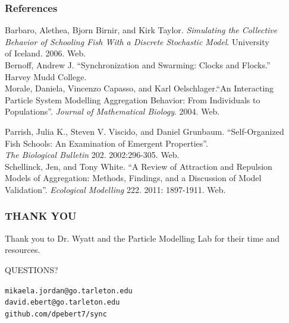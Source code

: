 \documentclass[xcolor=dvipsnames]{beamer}
\begin{document}
\begin{frame}
	\frametitle{References}
	\footnotesize{
	Barbaro, Alethea, Bjorn Birnir, and Kirk Taylor. \textit{Simulating the Collective} \\
	\hspace{0.5cm} \textit{Behavior of Schooling Fish With a Discrete Stochastic Model}. University\\
	\hspace{0.5cm} of Iceland. 2006. Web. \\
	
	\noindent Bernoff, Andrew J. ``Synchronization and Swarming: Clocks and Flocks.'' \\
	\hspace{0.5cm} Harvey Mudd College. \\
	
	\noindent Morale, Daniela, Vincenzo Capasso, and Karl Oelschlager.``An Interacting \\
	\hspace{0.5cm} Particle System Modelling Aggregation Behavior: From Individuals to\\
	\hspace{0.5cm} Populations''. \textit{Journal of Mathematical Biology}. 2004. Web.
	
	\noindent Parrish, Julia K., Steven V. Viscido, and Daniel Grunbaum. ``Self-Organized \\
	\hspace{0.5cm} Fish Schools: An Examination of Emergent Properties''. \\  
	\hspace{0.5cm} \textit{The Biological Bulletin} 202. 2002:296-305. Web. \\
	
	\noindent Schellinck, Jen, and Tony White. ``A Review of Attraction and Repulsion\\
	\hspace{0.5cm} Models of Aggregation: Methods, Findings, and a Discussion of Model \\
	\hspace{0.5cm} Validation''. \textit{Ecological Modelling} 222. 2011: 1897-1911. Web.
	}
\end{frame}

\begin{frame}
	\frametitle{THANK YOU} 
	Thank you to Dr. Wyatt and the Particle Modelling Lab for their time and resources.
	\vspace{20 pt}
	\begin{center}
		{\Huge QUESTIONS?} \\
	\end{center}
	\vspace{20 pt}	
	\texttt{mikaela.jordan@go.tarleton.edu} \\
	\texttt{david.ebert@go.tarleton.edu} \\
	\texttt{github.com/dpebert7/sync} \\
\end{frame}
\end{document}
